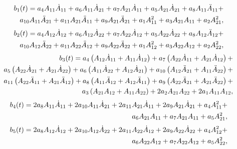 \documentclass{article}
\begin{document}
\begin{eqnarray}\label{b1}
    &&\mkern-36mu b_{1}(t) = a_4 A_{11} \dot{A}_{11}+a_6 A_{11} \dot{A}_{21}+a_7 A_{21} \dot{A}_{11}+a_5 A_{21} \dot{A}_{21}+a_8 A_{11} \ddot{A}_{11}+\nonumber\\
    &&\mkern-36mu a_{10} A_{11} \ddot{A}_{21}+a_{11} A_{21} \ddot{A}_{11}+a_9 A_{21} \ddot{A}_{21}+a_1 A_{11}^2+a_3 A_{21} A_{11}+a_2
   A_{21}^2,
\end{eqnarray}
\begin{eqnarray}\label{b2}
    &&\mkern-36mu b_{2}(t) = a_4 A_{12} \dot{A}_{12}+a_6 A_{12} \dot{A}_{22}+a_7 A_{22} \dot{A}_{12}+a_5 A_{22} \dot{A}_{22}+a_8 A_{12} \ddot{A}_{12}+\nonumber\\
    &&\mkern-36mua_{10} A_{12} \ddot{A}_{22}+a_{11} A_{22} \ddot{A}_{12}+a_9 A_{22} \ddot{A}_{22}+a_1 A_{12}^2+a_3 A_{22} A_{12}+a_2 A_{22}^2,
\end{eqnarray}
\begin{eqnarray}\label{b3}
    &&\mkern-36mu b_{3}(t) = a_4 \left(A_{12} \dot{A}_{11} + A_{11} \dot{A}_{12}\right)+a_7 \left(A_{22} \dot{A}_{11}+ A_{21} \dot{A}_{12}\right)+\nonumber\\
    &&\mkern-36mu a_5 \left(A_{22} \dot{A}_{21} + A_{21} \dot{A}_{22}\right)+a_6 \left(A_{11} \dot{A}_{22} + A_{12} \dot{A}_{21}\right)+a_{10}\left( A_{12} \ddot{A}_{21}+ A_{11} \ddot{A}_{22}\right)+\nonumber\\
    &&\mkern-36mu a_{11}\left(A_{22} \ddot{A}_{11}+ A_{21} \ddot{A}_{12}\right)+a_8 \left( A_{11} \ddot{A}_{12} + A_{12} \ddot{A}_{11}\right)+a_9 \left( A_{22} \ddot{A}_{21}+ A_{21} \ddot{A}_{22}\right)+\nonumber\\
    &&\mkern-36mu a_3 \left(A_{21} A_{12}+A_{11} A_{22}\right)+2 a_2 A_{21} A_{22} + 2 a_1 A_{11} A_{12},
\end{eqnarray}
\begin{eqnarray}\label{b4}
    &&\mkern-36mu b_{4}(t) = 2 a_8 A_{11} \dot{A}_{11}+2 a_{10} A_{11} \dot{A}_{21}+2 a_{11} A_{21} \dot{A}_{11}+2 a_9 A_{21} \dot{A}_{21}+a_4 A_{11}^2+\nonumber\\
    &&\mkern-36mua_6 A_{21} A_{11}+a_7 A_{21} A_{11}+a_5 A_{21}^2,
\end{eqnarray}
\begin{eqnarray}\label{b5}
    &&\mkern-36mu b_{5}(t) = 2 a_8 A_{12} \dot{A}_{12}+2 a_{10} A_{12} \dot{A}_{22}+2 a_{11} A_{22} \dot{A}_{12}+2 a_9 A_{22} \dot{A}_{22}+a_4 A_{12}^2+\nonumber\\
    &&\mkern-36mu a_6 A_{22} A_{12}+a_7 A_{22} A_{12}+a_5 A_{22}^2,
\end{eqnarray}
\end{document}
